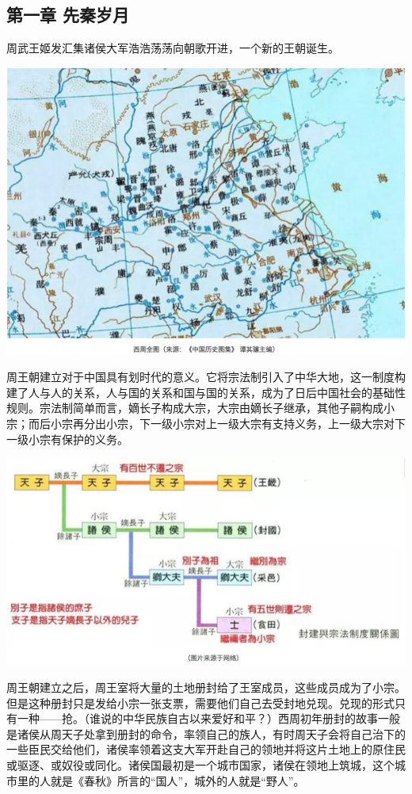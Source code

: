 \documentclass[]{book}
\begin{document}
\subsection{第一章 先秦岁月}\label{-}

周武王姬发汇集诸侯大军浩浩荡荡向朝歌开进，一个新的王朝诞生。

\includegraphics[width=8.33in]{images/gx1}

周王朝建立对于中国具有划时代的意义。它将宗法制引入了中华大地，这一制度构建了人与人的关系，人与国的关系和国与国的关系，成为了日后中国社会的基础性规则。宗法制简单而言，嫡长子构成大宗，大宗由嫡长子继承，其他子嗣构成小宗；而后小宗再分出小宗，下一级小宗对上一级大宗有支持义务，上一级大宗对下一级小宗有保护的义务。

\includegraphics[width=8.33in]{images/gx2}

周王朝建立之后，周王室将大量的土地册封给了王室成员，这些成员成为了小宗。但是这种册封只是发给小宗一张支票，需要他们自己去受封地兑现。兑现的形式只有一种------抢。（谁说的中华民族自古以来爱好和平？）西周初年册封的故事一般是诸侯从周天子处拿到册封的命令，率领自己的族人，有时周天子会将自己治下的一些臣民交给他们，诸侯率领着这支大军开赴自己的领地并将这片土地上的原住民或驱逐、或奴役或同化。诸侯国最初是一个城市国家，诸侯在领地上筑城，这个城市里的人就是《春秋》所言的``国人''，城外的人就是``野人''。
\end{document}
